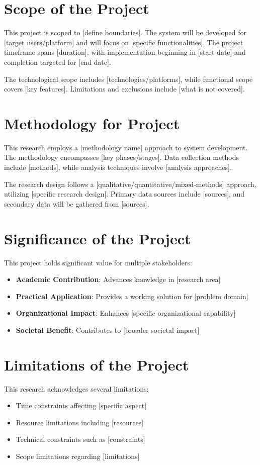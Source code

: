 \documentclass[12pt,twoside]{report}
\begin{document}
\section{Scope of the Project}
This project is scoped to [define boundaries]. The system will be developed for [target users/platform] and will focus on [specific functionalities]. The project timeframe spans [duration], with implementation beginning in [start date] and completion targeted for [end date].

The technological scope includes [technologies/platforms], while functional scope covers [key features]. Limitations and exclusions include [what is not covered].

\section{Methodology for Project}
This research employs a [methodology name] approach to system development. The methodology encompasses [key phases/stages]. Data collection methods include [methods], while analysis techniques involve [analysis approaches].

The research design follows a [qualitative/quantitative/mixed-methods] approach, utilizing [specific research design]. Primary data sources include [sources], and secondary data will be gathered from [sources].

\section{Significance of the Project}
This project holds significant value for multiple stakeholders:
\begin{itemize}
    \item \textbf{Academic Contribution}: Advances knowledge in [research area]
    \item \textbf{Practical Application}: Provides a working solution for [problem domain]
    \item \textbf{Organizational Impact}: Enhances [specific organizational capability]
    \item \textbf{Societal Benefit}: Contributes to [broader societal impact]
\end{itemize}

\section{Limitations of the Project}
This research acknowledges several limitations:
\begin{itemize}
    \item Time constraints affecting [specific aspect]
    \item Resource limitations including [resources]
    \item Technical constraints such as [constraints]
    \item Scope limitations regarding [limitations]
\end{itemize}
\end{document}
